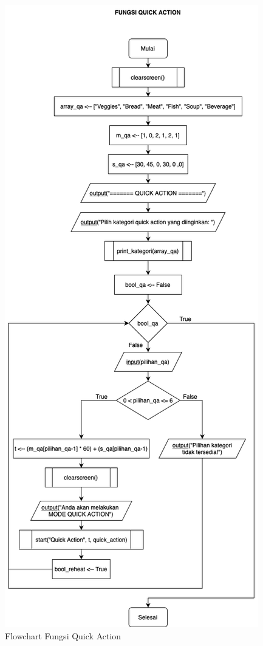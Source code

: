 \documentclass[conference]{IEEEtran}
\begin{document}
\begin{figure}[htbp]
    \centering
    \def\svgwidth{\columnwidth}
    \centerline{\includegraphics[scale=0.475]{QuickAction.png}}
    \caption{Flowchart Fungsi Quick Action}
    \label{fig12}
\end{figure}
\end{document}
